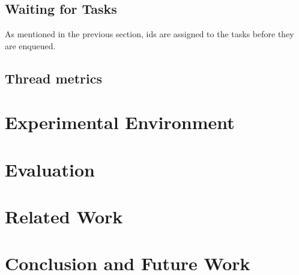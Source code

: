 \documentclass[conference]{IEEEtran}
\begin{document}
\subsection{Waiting for Tasks}
As mentioned in the previous section, ids are assigned to the tasks before they are enqueued. 
\subsection{Thread metrics}

\section{Experimental Environment}

\section{Evaluation}

\section{Related Work}

\section{Conclusion and Future Work}


 
\end{document}
